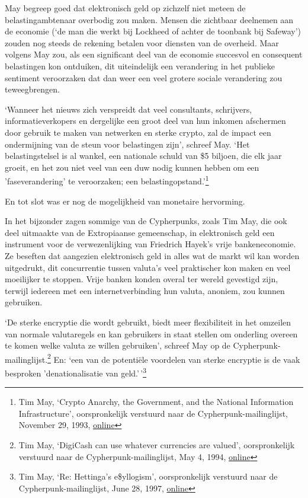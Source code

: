\documentclass[smalldemyvopaper,11pt,twoside,onecolumn,openright,extrafontsizes,hidelinks]{memoir}
\begin{document}
May begreep goed dat elektronisch geld op zichzelf niet meteen de
belastingambtenaar overbodig zou maken. Mensen die zichtbaar deelnemen
aan de economie (`de man die werkt bij Lockheed of achter de toonbank
bij Safeway') zouden nog steeds de rekening betalen voor diensten van de
overheid. Maar volgens May zou, als een significant deel van de economie
succesvol en consequent belastingen kon ontduiken, dit uiteindelijk een
verandering in het publieke sentiment veroorzaken dat dan weer een veel
grotere sociale verandering zou teweegbrengen.

`Wanneer het nieuws zich verspreidt dat veel consultants, schrijvers,
informatieverkopers en dergelijke een groot deel van hun inkomen
afschermen door gebruik te maken van netwerken en sterke crypto, zal de
impact een ondermijning van de steun voor belastingen zijn', schreef
May. `Het belastingstelsel is al wankel, een nationale schuld van \$5
biljoen, die elk jaar groeit, en het zou niet veel van een duw nodig
kunnen hebben om een 'faseverandering' te veroorzaken; een
belastingopstand.'\footnote{Tim May, `Crypto Anarchy, the Government,
  and the National Information Infrastructure', oorspronkelijk verstuurd
  naar de Cypherpunk-mailinglijst, November 29, 1993,
  \href{https://cypherpunks.venona.com/date/1993/11/msg01106.html}{online}}

En tot slot was er nog de mogelijkheid van monetaire hervorming.

In het bijzonder zagen sommige van de Cypherpunks, zoals Tim May, die
ook deel uitmaakte van de Extropiaanse gemeenschap, in elektronisch geld
een instrument voor de verwezenlijking van Friedrich Hayek's vrije
bankeneconomie. Ze beseften dat aangezien elektronisch geld in alles wat
de markt wil kan worden uitgedrukt, dit concurrentie tussen valuta's
veel praktischer kon maken en veel moeilijker te stoppen. Vrije banken
konden overal ter wereld gevestigd zijn, terwijl iedereen met een
internetverbinding hun valuta, anoniem, zou kunnen gebruiken.

`De sterke encryptie die wordt gebruikt, biedt meer flexibiliteit in het
omzeilen van normale valutaregels en kan gebruikers in staat stellen om
onderling overeen te komen welke valuta ze willen gebruiken', schreef
May op de Cypherpunk-mailinglijst.\footnote{Tim May, `DigiCash can use
  whatever currencies are valued', oorspronkelijk verstuurd naar de
  Cypherpunk-mailinglijst, May 4, 1994,
  \href{https://cypherpunks.venona.com/date/1994/05/msg00243.html}{online}}
En: `een van de potentiële voordelen van sterke encryptie is de vaak
besproken 'denationalisatie van geld.'\,'\footnote{Tim May, `Re:
  Hettinga's e\$yllogism', oorspronkelijk verstuurd naar de
  Cypherpunk-mailinglijst, June 28, 1997,
  \href{https://cypherpunks.venona.com/date/1997/06/msg01637.html}{online}}
\end{document}
